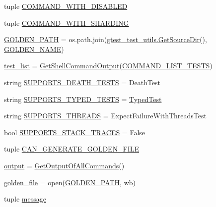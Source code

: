 \begin{DoxyCompactItemize}
tuple \hyperlink{namespacegtest__output__test_a0ef963a39dc8e53616ba2dab9f128def}{C\+O\+M\+M\+A\+N\+D\+\_\+\+W\+I\+T\+H\+\_\+\+D\+I\+S\+A\+B\+L\+ED}
\item 
tuple \hyperlink{namespacegtest__output__test_a462eef2a00782001d491b7a38a847bec}{C\+O\+M\+M\+A\+N\+D\+\_\+\+W\+I\+T\+H\+\_\+\+S\+H\+A\+R\+D\+I\+NG}
\item 
\hyperlink{namespacegtest__output__test_aa592d897eeba0ac7e1a3c7d84f182c11}{G\+O\+L\+D\+E\+N\+\_\+\+P\+A\+TH} = os.\+path.\+join(\hyperlink{namespacegtest__test__utils_aaff66cb0980804d8bd57dc719d4b5518}{gtest\+\_\+test\+\_\+utils.\+Get\+Source\+Dir}(), \hyperlink{namespacegtest__output__test_a317ece7d11d9103a7bdbf0320b64a981}{G\+O\+L\+D\+E\+N\+\_\+\+N\+A\+ME})
\item 
\hyperlink{namespacegtest__output__test_aec4b3602697dfdee3283be82c5fe6232}{test\+\_\+list} = \hyperlink{namespacegtest__output__test_a0dbdd37611259249a58ab13ed60d8172}{Get\+Shell\+Command\+Output}(\hyperlink{namespacegtest__output__test_ad57de209fb07e1002c8a929dd8a15dc9}{C\+O\+M\+M\+A\+N\+D\+\_\+\+L\+I\+S\+T\+\_\+\+T\+E\+S\+TS})
\item 
string \hyperlink{namespacegtest__output__test_a401e837dae10d6c728bd74684884a77f}{S\+U\+P\+P\+O\+R\+T\+S\+\_\+\+D\+E\+A\+T\+H\+\_\+\+T\+E\+S\+TS} = \textquotesingle{}Death\+Test\textquotesingle{}
\item 
string \hyperlink{namespacegtest__output__test_aa762abdf62ac6efe1aa2405b3f506380}{S\+U\+P\+P\+O\+R\+T\+S\+\_\+\+T\+Y\+P\+E\+D\+\_\+\+T\+E\+S\+TS} = \textquotesingle{}\hyperlink{class_typed_test}{Typed\+Test}\textquotesingle{}
\item 
string \hyperlink{namespacegtest__output__test_a9c611ee196914defbb5d32a47c606640}{S\+U\+P\+P\+O\+R\+T\+S\+\_\+\+T\+H\+R\+E\+A\+DS} = \textquotesingle{}Expect\+Failure\+With\+Threads\+Test\textquotesingle{}
\item 
bool \hyperlink{namespacegtest__output__test_a1e8e722c50268029e33d6fde753cff54}{S\+U\+P\+P\+O\+R\+T\+S\+\_\+\+S\+T\+A\+C\+K\+\_\+\+T\+R\+A\+C\+ES} = False
\item 
tuple \hyperlink{namespacegtest__output__test_aa370a0da630f54a564d79507df196854}{C\+A\+N\+\_\+\+G\+E\+N\+E\+R\+A\+T\+E\+\_\+\+G\+O\+L\+D\+E\+N\+\_\+\+F\+I\+LE}
\item 
\hyperlink{namespacegtest__output__test_a1984d02025db23de921254c2f2638dbb}{output} = \hyperlink{namespacegtest__output__test_a9d88a4a9a91b97a369abac2170a23ebe}{Get\+Output\+Of\+All\+Commands}()
\item 
\hyperlink{namespacegtest__output__test_a0a02ae5e249d93c376bbce6fb87f9405}{golden\+\_\+file} = open(\hyperlink{namespacegtest__output__test_aa592d897eeba0ac7e1a3c7d84f182c11}{G\+O\+L\+D\+E\+N\+\_\+\+P\+A\+TH}, \textquotesingle{}wb\textquotesingle{})
\item 
tuple \hyperlink{namespacegtest__output__test_ac696d0798ad7d08cb2e61070824750e2}{message}
\end{DoxyCompactItemize}


